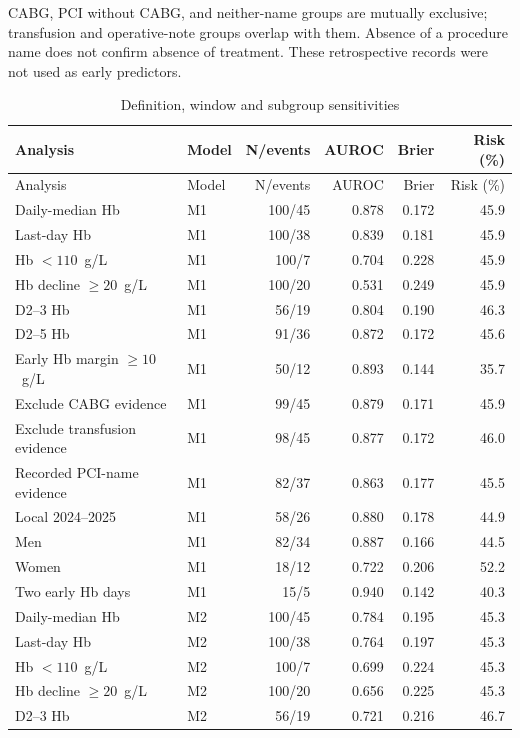 \documentclass[pdflatex,sn-vancouver-num]{sn-jnl}
\begin{document}
\noindent CABG, PCI without CABG, and neither-name groups are mutually exclusive; transfusion and operative-note groups overlap with them. Absence of a procedure name does not confirm absence of treatment. These retrospective records were not used as early predictors.\par\endgroup
\begingroup\scriptsize\setlength{\tabcolsep}{2pt}
\begin{longtable}{p{4.4cm}lrrrr}
\caption{Definition, window and subgroup sensitivities}\label{tab:s8}\\
\toprule
Analysis & Model & N/events & AUROC & Brier & Risk (\%)\\\midrule
\endfirsthead
\toprule
Analysis & Model & N/events & AUROC & Brier & Risk (\%)\\\midrule
\endhead
\endfoot
\bottomrule\endlastfoot
Daily-median Hb & M1 & 100/45 & 0.878 & 0.172 & 45.9\\
Last-day Hb & M1 & 100/38 & 0.839 & 0.181 & 45.9\\
Hb $<110$~g/L & M1 & 100/7 & 0.704 & 0.228 & 45.9\\
Hb decline $\geq 20$~g/L & M1 & 100/20 & 0.531 & 0.249 & 45.9\\
D2--3 Hb & M1 & 56/19 & 0.804 & 0.190 & 46.3\\
D2--5 Hb & M1 & 91/36 & 0.872 & 0.172 & 45.6\\
Early Hb margin $\geq 10$~g/L & M1 & 50/12 & 0.893 & 0.144 & 35.7\\
Exclude CABG evidence & M1 & 99/45 & 0.879 & 0.171 & 45.9\\
Exclude transfusion evidence & M1 & 98/45 & 0.877 & 0.172 & 46.0\\
Recorded PCI-name evidence & M1 & 82/37 & 0.863 & 0.177 & 45.5\\
Local 2024--2025 & M1 & 58/26 & 0.880 & 0.178 & 44.9\\
Men & M1 & 82/34 & 0.887 & 0.166 & 44.5\\
Women & M1 & 18/12 & 0.722 & 0.206 & 52.2\\
Two early Hb days & M1 & 15/5 & 0.940 & 0.142 & 40.3\\
Daily-median Hb & M2 & 100/45 & 0.784 & 0.195 & 45.3\\
Last-day Hb & M2 & 100/38 & 0.764 & 0.197 & 45.3\\
Hb $<110$~g/L & M2 & 100/7 & 0.699 & 0.224 & 45.3\\
Hb decline $\geq 20$~g/L & M2 & 100/20 & 0.656 & 0.225 & 45.3\\
D2--3 Hb & M2 & 56/19 & 0.721 & 0.216 & 46.7\\

\end{longtable}
\end{document}
